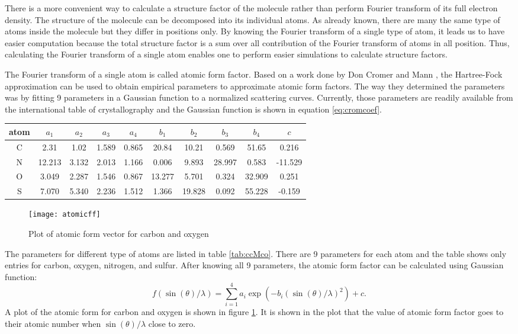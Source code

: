 There is a more convenient way to calculate a structure factor of the molecule rather than perform Fourier transform of its full electron density. The structure of the molecule can be decomposed into its individual atoms. As already known, there are many the same type of atoms inside the molecule but they differ in positions only. By knowing the Fourier transform of a single type of atom, it leads us to have easier computation because the total structure factor is a sum over all contribution of the Fourier transform of atoms in all position. Thus, calculating the Fourier transform of a single atom enables one to perform easier simulations to calculate structure factors.

The Fourier transform of a single atom is called atomic form factor. Based on a work done by Don Cromer and Mann \cite{CromerMann}, the Hartree-Fock approximation can be used to obtain empirical parameters to approximate atomic form factors. The way they determined the parameters was by fitting 9 parameters in a Gaussian function to a normalized scattering curves. Currently, those parameters are readily available from the international table of crystallography \cite{tablecryst} and the Gaussian function is shown in equation \ref{eq:cromcoef}. 

\begin{center}
  \begin{tabular}{| c | c | c | c | c | c | c | c | c | c | }
    \hline
    atom & $a_1$ & $a_2$ & $a_3$ & $a_4$ & $b_1 $& $b_2$ &$b_3$&$b_4$&$c$ \\ \hline
    C & 2.31 & 1.02 & 1.589 & 0.865 & 20.84 & 10.21 & 0.569 & 51.65 &0.216 \\ \hline
    N & 12.213 & 3.132 & 2.013 & 1.166 & 0.006 & 9.893 & 28.997 & 0.583 &-11.529 \\ \hline
    O & 3.049 & 2.287 & 1.546 & 0.867 & 13.277 & 5.701 & 0.324 & 32.909 & 0.251 \\ \hline
S & 7.070 & 5.340 & 2.236 & 1.512 & 1.366 & 19.828 & 0.092 & 55.228 & -0.159 \\ \hline
  \end{tabular}
\label{tab:ccMco}
\end{center}
\begin{figure}[ht]
  \centering
  \texttt{[image: atomicff]}
\caption{Plot of atomic form vector for carbon and oxygen}
\label{fig:atomicff}
\end{figure}
The parameters for different type of atoms are listed in table \ref{tab:ccMco}. There are 9 parameters for each atom and the table shows only entries for carbon, oxygen, nitrogen, and sulfur. After knowing all 9 parameters, the atomic form factor can be calculated using Gaussian function:
\begin{equation}
f(\sin(\theta)/\lambda)= \sum_{i=1}^{4} a_{i} \exp(-b_{i}(\sin(\theta)/\lambda)^2)+c. 
\label{eq:cromcoef}
\end{equation}
 A plot of the atomic form for carbon and oxygen is shown in figure \ref{fig:atomicff}. It is shown in the plot that the value of atomic form factor goes to their atomic number when $\sin(\theta)/\lambda$ close to zero.


